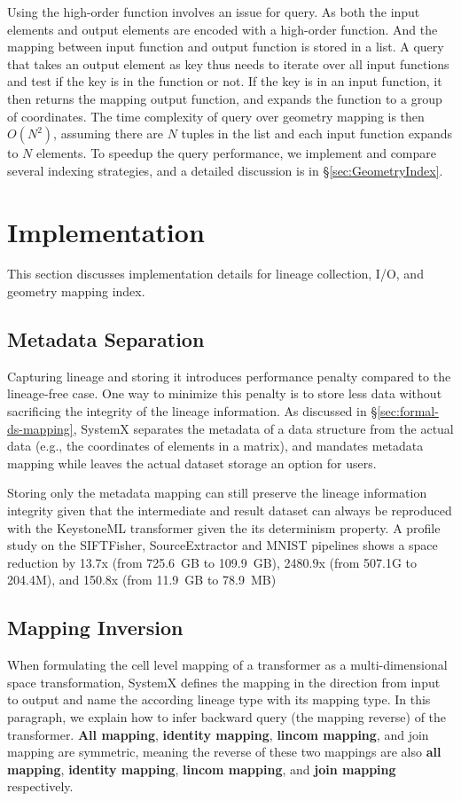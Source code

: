 \documentclass{sig-alternate}
\begin{document}
Using the high-order function involves an issue for query. 
As both the input elements and output elements are encoded with a high-order function. 
And the mapping between input function and output function is stored in a list. 
A query that takes an output element as key thus needs to iterate over all input functions and test if the key is in the function or not.
If the key is in an input function, it then returns the mapping output function, and expands the function to a group of coordinates.
The time complexity of query over geometry mapping is then $O(N^2)$, assuming there are $N$ tuples in the list and each input function expands to $N$ elements.
To speedup the query performance, we implement and compare several indexing strategies, and a detailed discussion is in \S\ref{sec:GeometryIndex}.


\section{Implementation}
\label{sec:Impl}

This section discusses implementation details for lineage collection, I/O, and geometry mapping index.

\subsection{Metadata Separation}
Capturing lineage and storing it introduces performance penalty compared to the lineage-free case. 
One way to minimize this penalty is to store less data without sacrificing the integrity of the lineage information.
As discussed in \S\ref{sec:formal-ds-mapping}, SystemX separates the metadata of a data structure from the 
actual data (e.g., the coordinates of elements in a matrix), and mandates metadata mapping while leaves
the actual dataset storage an option for users.

Storing only the metadata mapping can still preserve the lineage information integrity given that the intermediate and result 
dataset can always be reproduced with the KeystoneML transformer given the its determinism property. 
A profile study on the SIFTFisher, SourceExtractor and MNIST pipelines shows a space reduction by 
13.7x (from 725.6~GB to 109.9~GB), 2480.9x (from 507.1G to 204.4M), and 150.8x (from 11.9~GB to 78.9~MB)

\subsection{Mapping Inversion}
When formulating the cell level mapping of a transformer as a multi-dimensional space transformation, SystemX defines
the mapping in the direction from input to output and name the according lineage type with its mapping type.
In this paragraph, we explain how to infer backward query (the mapping reverse) of the transformer.
{\bf All mapping}, {\bf identity mapping}, {\bf lincom mapping}, and {join mapping} are symmetric, 
meaning the reverse of these two mappings are also {\bf all mapping}, {\bf identity mapping}, 
{\bf lincom mapping}, and {\bf join mapping} respectively.
\end{document}
